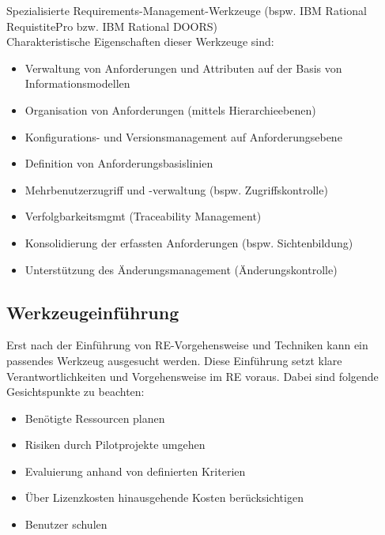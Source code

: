 \documentclass{report}
\theoremstyle{definition}
\theoremstyle{example}
\begin{document}
Spezialisierte Requirements-Management-Werkzeuge (bspw. IBM Rational RequistitePro bzw. IBM Rational DOORS)\\
Charakteristische Eigenschaften dieser Werkzeuge sind:
\begin{itemize}
   \item Verwaltung von Anforderungen und Attributen auf der Basis von Informationsmodellen
   \item Organisation von Anforderungen (mittels Hierarchieebenen)
   \item Konfigurations- und Versionsmanagement auf Anforderungsebene
   \item Definition von Anforderungsbasislinien
   \item Mehrbenutzerzugriff und -verwaltung (bspw. Zugriffskontrolle)
   \item Verfolgbarkeitsmgmt (Traceability Management)
   \item Konsolidierung der erfassten Anforderungen (bspw. Sichtenbildung)
   \item Unterstützung des Änderungsmanagement (Änderungskontrolle)
\end{itemize}

\subsection{Werkzeugeinführung}
Erst nach der Einführung von RE-Vorgehensweise und Techniken kann ein passendes Werkzeug ausgesucht werden. Diese Einführung setzt klare Verantwortlichkeiten und Vorgehensweise im RE voraus. Dabei sind folgende Gesichtspunkte zu beachten:
\begin{itemize}
   \item Benötigte Ressourcen planen
   \item Risiken durch Pilotprojekte umgehen
   \item Evaluierung anhand von definierten Kriterien
   \item Über Lizenzkosten hinausgehende Kosten berücksichtigen
   \item Benutzer schulen
\end{itemize}
\end{document}
